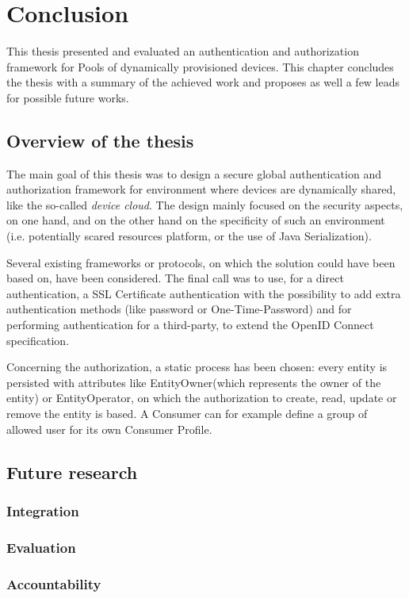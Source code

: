\chapter{Conclusion}
\label{cha:conclusion}

This thesis presented and evaluated an authentication and authorization framework for  Pools of dynamically provisioned devices. This chapter concludes the thesis with a summary of the achieved work and proposes as well a few leads for possible future works.

\section{Overview of the thesis}
The main goal of this thesis was to design a secure global authentication and authorization framework for environment where devices are dynamically shared, like the so-called \emph{device cloud}. The design mainly focused on the security aspects, on one hand, and on the other hand on the specificity of such an environment (i.e. potentially scared resources platform, or the use of Java Serialization). 

Several existing frameworks or protocols, on which the solution could have been based on, have been considered. The final call was to use, for a direct authentication, a SSL Certificate authentication with the possibility to add extra authentication methods (like password or One-Time-Password) and for performing authentication for a third-party, to extend the OpenID Connect specification.

Concerning the authorization, a static process has been chosen: every entity is persisted with attributes like EntityOwner(which represents the owner of the entity) or EntityOperator, on which the authorization to create, read, update or remove the entity is based. A Consumer can for example define a group of allowed user for its own Consumer Profile.

\section{Future research}

\subsection{Integration}

\subsection{Evaluation}

\subsection{Accountability}

